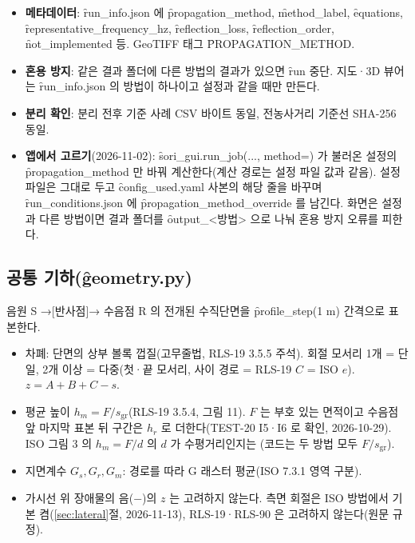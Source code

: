 \documentclass[10.5pt,a4paper]{article}
\begin{document}
\begin{itemize}
\item \textbf{메타데이터}: \f{run\_info.json} 에 \f{propagation\_method}, \f{method\_label}, \f{equations}, \f{representative\_frequency\_hz}, \f{reflection\_loss}, \f{reflection\_order}, \f{not\_implemented} 등. GeoTIFF 태그 \f{PROPAGATION\_METHOD}.
\item \textbf{혼용 방지}: 같은 결과 폴더에 다른 방법의 결과가 있으면 \f{run} 중단. 지도·3D 뷰어는 \f{run\_info.json} 의 방법이 하나이고 설정과 같을 때만 만든다.
\item \textbf{분리 확인}: 분리 전후 기준 사례 CSV 바이트 동일, 전농사거리 기준선 SHA-256 동일.
\item \textbf{앱에서 고르기}(2026-11-02): \f{sori\_gui.run\_job(..., method=)} 가 불러온 설정의 \f{propagation\_method} 만 바꿔 계산한다(계산 경로는 설정 파일 값과 같음). 설정 파일은 그대로 두고 \f{config\_used.yaml} 사본의 해당 줄을 바꾸며 \f{run\_conditions.json} 에 \f{propagation\_method\_override} 를 남긴다. 화면은 설정과 다른 방법이면 결과 폴더를 \f{output\_<방법>} 으로 나눠 혼용 방지 오류를 피한다.
\end{itemize}

\subsection{공통 기하(\f{geometry.py})}
음원 S →[반사점]→ 수음점 R 의 전개된 수직단면을 \f{profile\_step}(1 m) 간격으로 표본한다.
\begin{itemize}
\item 차폐: 단면의 상부 볼록 껍질(고무줄법, RLS-19 3.5.5 주석). 회절 모서리 1개 = 단일, 2개 이상 = 다중(첫·끝 모서리, 사이 경로 = RLS-19 $C$ = ISO $e$). $z = A + B + C - s$.
\item 평균 높이 $h_m = F/s_\mathrm{gr}$(RLS-19 3.5.4, 그림 11). $F$ 는 부호 있는 면적이고 수음점 앞 마지막 표본 뒤 구간은 $h_r$ 로 더한다(TEST-20 I5·I6 로 확인, 2026-10-29). ISO 그림 3 의 $h_m = F/d$ 의 $d$ 가 수평거리인지는 \nob{}(코드는 두 방법 모두 $F/s_\mathrm{gr}$).
\item 지면계수 $G_s, G_r, G_m$: 경로를 따라 G 래스터 평균(ISO 7.3.1 영역 구분).
\item 가시선 위 장애물의 음(−)의 $z$ 는 고려하지 않는다. 측면 회절은 ISO 방법에서 기본 켬(\ref{sec:lateral}절, 2026-11-13), RLS-19·RLS-90 은 고려하지 않는다(원문 규정).
\end{itemize}
\end{document}
